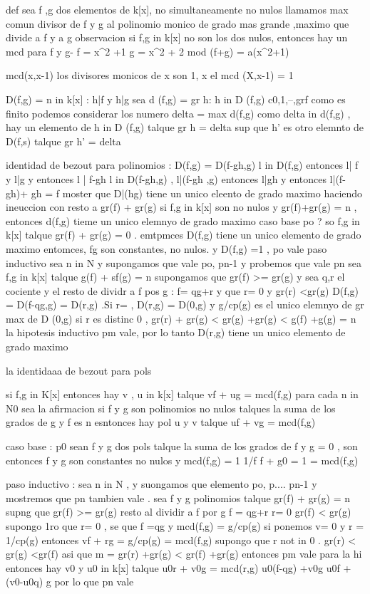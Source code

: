 def sea f ,g dos elementos de k[x], no simultaneamente no nulos llamamos max comun divisor de f y g 
al polinomio monico de grado mas grande ,maximo que divide a f y a g 
observacion si f,g in k[x] no son los dos nulos, entonces hay un mcd para f y g-
f = x^2 +1 
g = x^2 + 2 
mod (f+g) = a(x^2+1)

mcd(x,x-1)
los divisores monicos de x son 1, x
el mcd (X,x-1) = 1 

D(f,g) = {n in k[x] : h|f y h|g}
sea d (f,g) = {gr h: h in D (f,g)}
c{0,1,--,grf}
como es finito podemos considerar los numero delta = max d(f,g)
como delta in d(f,g) , hay un elemento de h in D (f,g) 
talque gr h = delta
sup que h' es otro elemnto de D(f,s) talque gr h' = delta


identidad de bezout para polinomios :
D(f,g) = D(f-gh,g)
l in D(f,g) entonces l| f y l|g
y entonces l | f-gh
l in D(f-gh,g) , l|(f-gh ,g) entonces l|gh
y entonces l|(f-gh)+ gh = f 
moster que D|(hg) tiene un unico eleento de grado maximo haciendo ineuccion con resto a gr(f) + gr(g)
si f,g in k[x] son no nulos  y gr(f)+gr(g) = n , entonces d(f,g) tieme un unico elemnyo de grado maximo
caso base po ? so f,g in k[x] talque gr(f) + gr(g) = 0 . emtpmces D(f,g) tiene un unico elemento de grado maximo
entomces, fg son constantes, no nulos. y D(f,g) ={1} , po vale
paso inductivo sea n in N y supongamos que vale po, pn-1 y probemos que vale pn sea f,g in k[x] talque g(f) + sf(g) = n supongamos que gr(f) >= gr(g) 
y sea q,r el cociente y el resto de dividr a f pos g : f= qg+r y que r= 0 y gr(r) <gr(g) 
D(f,g) = D(f-qg,g) = D(r,g) 
.Si r= , D(r,g) = D(0,g) 
y g/cp(g) es el unico elemnyo de gr max de D (0,g) 
si r es distinc 0 , gr(r) + gr(g) < gr(g) +gr(g) < g(f) +g(g) = n
la hipotesis inductivo pm vale, por lo tanto D(r,g) tiene un unico elemento de grado maximo

la identidaaa de bezout para pols 

si f,g in K[x] entonces hay v , u in k[x] talque vf + ug = mcd(f,g)
para cada n in N0 sea la afirmacion si f y g son polinomios no nulos talques la suma de los grados de g y f es n 
esntonces hay pol u y v talque uf + vg = mcd(f,g)

caso base : p0 sean f y g dos pols 
talque la suma de los grados de f y g = 0 , son entonces f y g son constantes no nulos y mcd(f,g) = 1 
1/f f + g0 = 1 = mcd(f,g)

paso inductivo : sea n in N , y suongamos que elemento po, p.... pn-1 y mostremos que pn tambien vale . sea f y g polinomios talque gr(f) + gr(g) = n 
supng que gr(f) >= gr(g) resto al dividir a f por g 
f = qg+r
r= 0  gr(f) < gr(g) 
supongo 1ro que r= 0 , se que f =qg y mcd(f,g) = g/cp(g) 
si ponemos v= 0 y r = 1/cp(g)
entonces vf + rg = g/cp(g) = mcd(f,g) 
supongo que r not in 0 . gr(r) < gr(g) <gr(f) 
asi que m = gr(r) +gr(g) < gr(f) +gr(g)
entonces pm vale para la hi 
entonces hay v0 y u0 in k[x] talque 
u0r + v0g = mcd(r,g) 
u0(f-qg) +v0g 
u0f + (v0-u0q) g 
por lo que pn vale 

